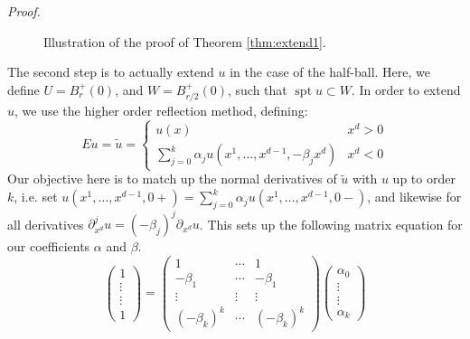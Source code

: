 \documentclass[letterpaper,10pt]{article}
\DeclareMathOperator{\spt}{spt}
\theoremstyle{definition}
\theoremstyle{remark}
\theoremstyle{plain}
\renewenvironment{proof}{
    \vspace{5pt}
    \begin{mdframed}[bottomline=false,topline=false,rightline=false, skipabove=0]
    \noindent\textit{Proof.}}
{
    \hspace{\fill}\qedsymbol
    \end{mdframed}
}
\begin{document}
\begin{proof}
    \begin{wrapfigure}{r}{0.3\textwidth}
        \centering
        \caption{Illustration of the proof of Theorem \ref{thm:extend1}.}
    \end{wrapfigure}
    The second step is to actually extend $u$ in the case of the half-ball.
    Here, we define $U=B_r^+(0)$, and $W=B_{r/2}^+(0)$, 
    such that $\spt u\subset W$.
    In order to extend $u$, we use the higher order reflection method,
    defining:
    $$
        Eu=\tilde u=\left\{
        \begin{matrix}
            u(x)        &   x^d>0\\
            \sum_{j=0}^{k}\alpha_ju(x^1,\ldots,x^{d-1},-\beta_jx^d) &   x^d<0
        \end{matrix}\right.
    $$
    Our objective here is to match up the normal derivatives of $\tilde u$ with $u$
    up to order $k$, i.e. set $u(x^1,\ldots, x^{d-1}, 0+)=\sum_{j=0}^{k}\alpha_ju(x^1,\ldots, x^{d-1},0-)$,
    and likewise for all derivatives $\partial_{x^d}^ju=(-\beta_j)^j\partial_{x^d}u$.
    This sets up the following matrix equation for our coefficients $\alpha$ and $\beta$.
    $$
    \begin{pmatrix}
        1\\\vdots\\\vdots\\1
    \end{pmatrix}
    =
    \begin{pmatrix}
        1   &   \cdots  &   1\\
        -\beta_1    &   \cdots &    -\beta_1\\
        \vdots & \vdots & \vdots\\
        (-\beta_k)^k&\cdots&(-\beta_k)^k
    \end{pmatrix}
    \begin{pmatrix}
    \alpha_0\\\vdots\\\vdots\\\alpha_k

\end{pmatrix}$$
\end{proof}
\end{document}
